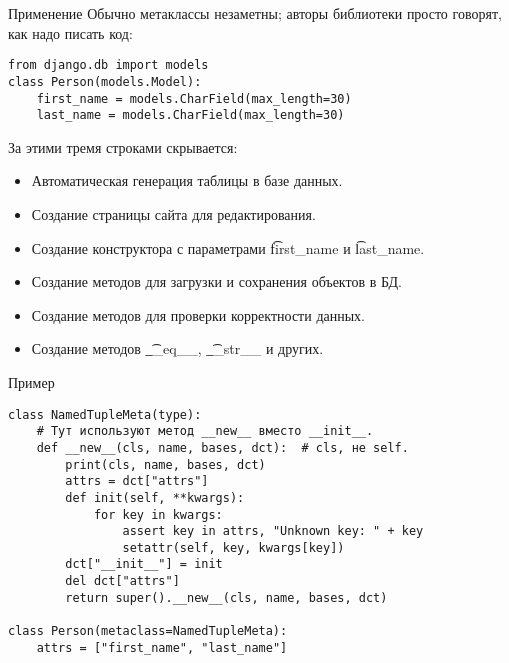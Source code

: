 \begin{frame}[fragile]{Применение}
	Обычно метаклассы незаметны; авторы библиотеки просто говорят, как надо писать код:
\begin{verbatim}
from django.db import models
class Person(models.Model):
    first_name = models.CharField(max_length=30)
    last_name = models.CharField(max_length=30)
\end{verbatim}
	За этими тремя строками скрывается:
	\begin{itemize}
		\item Автоматическая генерация таблицы в базе данных.
		\item Создание страницы сайта для редактирования.
		\item Создание конструктора с параметрами \t{first\_name} и \t{last\_name}.
		\item Создание методов для загрузки и сохранения объектов в БД.
		\item Создание методов для проверки корректности данных.
		\item Создание методов \t{\_\_eq\_\_}, \t{\_\_str\_\_} и других.
	\end{itemize}
\end{frame}

\begin{frame}[fragile]{Пример}
\begin{verbatim}
class NamedTupleMeta(type):
    # Тут используют метод __new__ вместо __init__.
    def __new__(cls, name, bases, dct):  # cls, не self.
        print(cls, name, bases, dct)
        attrs = dct["attrs"]
        def init(self, **kwargs):
            for key in kwargs:
                assert key in attrs, "Unknown key: " + key
                setattr(self, key, kwargs[key])
        dct["__init__"] = init
        del dct["attrs"]
        return super().__new__(cls, name, bases, dct)

class Person(metaclass=NamedTupleMeta):
    attrs = ["first_name", "last_name"]
\end{verbatim}
\end{frame}
